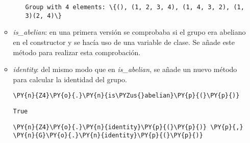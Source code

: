 \begin{itemize}
\begin{itemize}
\begin{enumerate}
    \begin{Verbatim}[commandchars=\\\{\}]
Group with 4 elements: \{(), (1, 2, 3, 4), (1, 4, 3, 2), (1, 3)(2, 4)\}
    \end{Verbatim}


  \end{enumerate}


        
   \item  \textit{is\_abelian}: en una primera versión se comprobaba si el
grupo era abeliano en el constructor y se hacía uso de una variable de
clase. Se añade este método para realizar esta comprobación.

 \item \textit{identity}: del mismo modo que en \textit{is\_abelian},
se añade un nuevo método para calcular la identidad del grupo.

    \begin{tcolorbox}[breakable, size=fbox, boxrule=1pt, pad at break*=1mm,colback=cellbackground, colframe=cellborder]
\begin{Verbatim}[commandchars=\\\{\}]
\PY{n}{Z4}\PY{o}{.}\PY{n}{is\PYZus{}abelian}\PY{p}{(}\PY{p}{)}
\end{Verbatim}
\end{tcolorbox}

            \begin{tcolorbox}[breakable, size=fbox, boxrule=.5pt, pad at break*=1mm, opacityfill=0]
\begin{Verbatim}[commandchars=\\\{\}]
True
\end{Verbatim}
\end{tcolorbox}



\newpage 

    \begin{tcolorbox}[breakable, size=fbox, boxrule=1pt, pad at break*=1mm,colback=cellbackground, colframe=cellborder]
\begin{Verbatim}[commandchars=\\\{\}]
\PY{n}{Z4}\PY{o}{.}\PY{n}{identity}\PY{p}{(}\PY{p}{)} \PY{p}{,} \PY{n}{G}\PY{o}{.}\PY{n}{identity}\PY{p}{(}\PY{p}{)}
\end{Verbatim}
\end{tcolorbox}


\end{itemize}
\end{itemize}
